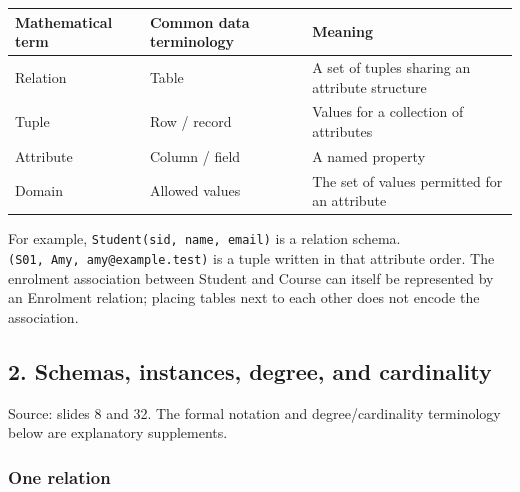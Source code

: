 \begin{longtable}[]{@{}
  >{\raggedright\arraybackslash}p{}
  >{\raggedright\arraybackslash}p{}
  >{\raggedright\arraybackslash}p{}@{}}
\toprule\noalign{}
\begin{minipage}[b]{\linewidth}\raggedright
Mathematical term
\end{minipage} & \begin{minipage}[b]{\linewidth}\raggedright
Common data terminology
\end{minipage} & \begin{minipage}[b]{\linewidth}\raggedright
Meaning
\end{minipage} \\
\midrule\noalign{}
\endhead
\bottomrule\noalign{}
\endlastfoot
Relation & Table & A set of tuples sharing an attribute structure \\
Tuple & Row / record & Values for a collection of attributes \\
Attribute & Column / field & A named property \\
Domain & Allowed values & The set of values permitted for an attribute \\
\end{longtable}

For example, \texttt{Student(\allowbreak{}sid,\allowbreak{}\ name,\allowbreak{}\ email)\allowbreak{}} is a relation schema. \texttt{(\allowbreak{}S01,\allowbreak{}\ Amy,\allowbreak{}\ amy@example.\allowbreak{}test)\allowbreak{}} is a tuple written in that attribute order. The enrolment association between Student and Course can itself be represented by an Enrolment relation; placing tables next to each other does not encode the association.

\subsection{2. Schemas, instances, degree, and cardinality}\label{03_relational_model_and_integrity_en-schemas-instances-degree-and-cardinality}

Source: slides 8 and 32. The formal notation and degree/cardinality terminology below are explanatory supplements.

\subsubsection{One relation}\label{03_relational_model_and_integrity_en-one-relation}

